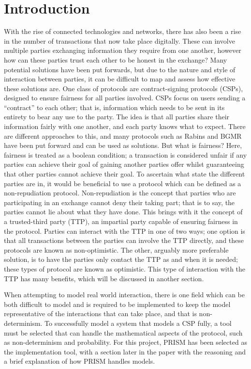 \documentclass{l4proj}
\begin{document}
\chapter{Introduction}
With the rise of connected technologies and networks, there has also been a rise in the number of transactions that now take place digitally. These can involve multiple parties exchanging information they require from one another, however how can these parties trust each other to be honest in the exchange? Many potential solutions have been put forwards, but due to the nature and style of interaction between parties, it can be difficult to map and assess how effective these solutions are. One class of protocols are contract-signing protocols (CSPs), designed to ensure fairness for all parties involved.
CSPs focus on users sending a “contract” to each other; that is, information which needs to be sent in its entirety to bear any use to the party. The idea is that all parties share their information fairly with one another, and each party knows what to expect. There are different approaches to this, and many protocols such as Rabins and BGMR have been put forward and can be used as solutions. But what is fairness? Here, fairness is treated as a boolean condition; a transaction is considered unfair if any parties can achieve their goal of gaining another parties offer whilst guaranteeing that other parties cannot achieve their goal. To ascertain what state the different parties are in, it would be beneficial to use a protocol which can be defined as a non-repudiation protocol.
Non-repudiation is the concept that parties who are participating in an exchange cannot deny their taking part; that is to say, the parties cannot lie about what they have done. This brings with it the concept of a trusted-third party (TTP), an impartial party capable of ensuring fairness in the protocol. Parties can interact with the TTP in one of two ways; one option is that all transactions between the parties can involve the TTP directly, and these protocols are known as non-optimistic. The other, arguably more preferable solution, is to have the parties only contact the TTP as and when it is needed; these types of protocol are known as optimistic. This type of interaction with the TTP has many benefits, which will be discussed in another section.

When attempting to model real world interaction, there is one field which can be both difficult to model and is required to be implemented to keep the model representative of the interactions that can take place, and that is non-determinism. To successfully model a system that models a CSP fully, a tool must be selected that can handle the mathematical aspects of the protocol, such as non-determinism and probability. For this project, PRISM has been selected as the implementation tool, with a section later in the paper with the reasoning and a brief explanation of how PRISM handles models.
\end{document}
